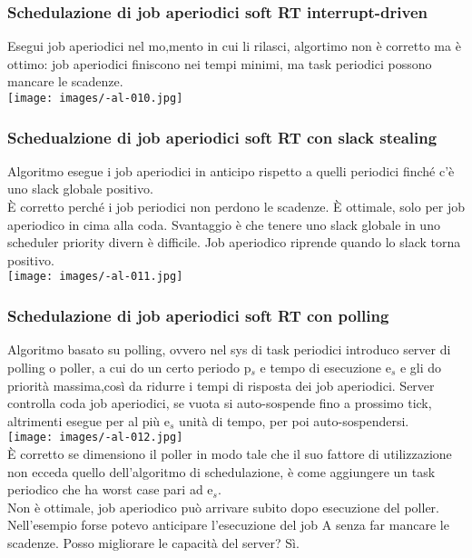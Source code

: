 \documentclass{article}
\begin{document}
\subsubsection{Schedulazione di job aperiodici soft RT interrupt-driven}
Esegui job aperiodici nel mo,mento in cui li rilasci, algortimo non è corretto ma è ottimo: job aperiodici finiscono nei tempi minimi, ma task periodici possono mancare le scadenze.\\
\texttt{[image: images/-al-010.jpg]}\\
\subsubsection{Schedualzione di job aperiodici soft RT con slack stealing}
Algoritmo esegue i job aperiodici in anticipo rispetto a quelli periodici finché c'è uno slack globale positivo.\\ È corretto perché i job periodici non perdono le scadenze. È ottimale, solo per job aperiodico in cima alla coda. Svantaggio è che tenere uno slack globale in uno scheduler priority divern è difficile.
Job aperiodico riprende quando lo slack torna positivo.\\
\texttt{[image: images/-al-011.jpg]}\\
\subsubsection{Schedulazione di job aperiodici soft RT con polling}
Algoritmo basato su polling, ovvero nel sys di task periodici introduco server di polling o poller, a cui do un certo periodo p$_{s}$ e tempo di esecuzione e$_{s}$ e gli do priorità massima,così da ridurre i tempi di risposta dei job aperiodici. Server controlla coda job aperiodici, se vuota si auto-sospende fino a prossimo tick, altrimenti esegue per al più
e$_{s}$ unità di tempo, per poi auto-sospendersi.\\ 
\texttt{[image: images/-al-012.jpg]}\\
È corretto se dimensiono il poller in modo tale che il suo fattore di utilizzazione non ecceda quello dell'algoritmo di schedulazione, è come aggiungere un task periodico che ha worst case pari ad e$_{s}$. \\ Non è ottimale, job aperiodico può arrivare subito dopo esecuzione del poller. Nell'esempio forse potevo anticipare l'esecuzione del job A senza far mancare le scadenze. Posso migliorare le capacità del server? Sì.
\end{document}
